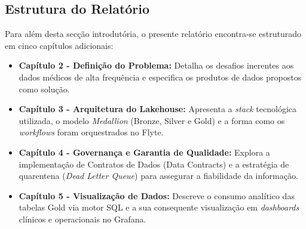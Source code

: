 \subsection{Estrutura do Relatório}
Para além desta secção introdutória, o presente relatório encontra-se estruturado em cinco capítulos adicionais:
\begin{itemize}
	\item \textbf{Capítulo 2 - Definição do Problema:} Detalha os desafios inerentes aos dados médicos de alta frequência e especifica os produtos de dados propostos como solução.
	\item \textbf{Capítulo 3 - Arquitetura do Lakehouse:} Apresenta a \textit{stack} tecnológica utilizada, o modelo \textit{Medallion} (Bronze, Silver e Gold) e a forma como os \textit{workflows} foram orquestrados no Flyte.
	\item \textbf{Capítulo 4 - Governança e Garantia de Qualidade:} Explora a implementação de Contratos de Dados (Data Contracts) e a estratégia de quarentena (\textit{Dead Letter Queue}) para assegurar a fiabilidade da informação.
	\item \textbf{Capítulo 5 - Visualização de Dados:} Descreve o consumo analítico das tabelas Gold via motor SQL e a sua consequente visualização em \textit{dashboards} clínicos e operacionais no Grafana.
\end{itemize}